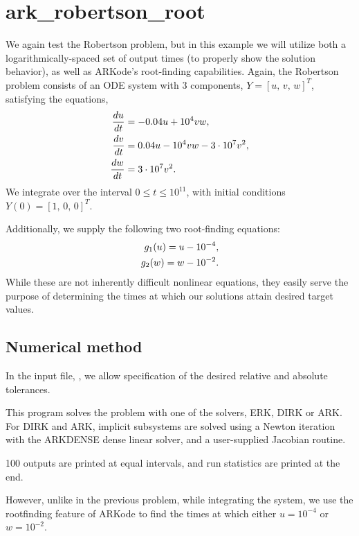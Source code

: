 \documentclass[letterpaper,10pt,english]{sphinxmanual}
\begin{document}
\chapter{ark\_robertson\_root}
\label{ark_robertson_root:ark-robertson-root}\label{ark_robertson_root::doc}\label{ark_robertson_root:id1}
We again test the Robertson problem, but in this example we will
utilize both a logarithmically-spaced set of output times (to properly
show the solution behavior), as well as ARKode's root-finding
capabilities.  Again, the Robertson problem consists of an ODE system
with 3 components, $Y = [u,\, v,\, w]^T$, satisfying the equations,
\begin{gather}
\begin{split}\frac{du}{dt} &= -0.04 u + 10^4 v w, \\
\frac{dv}{dt} &= 0.04 u - 10^4 v w - 3\cdot10^7 v^2, \\
\frac{dw}{dt} &= 3\cdot10^7 v^2.\end{split}\notag
\end{gather}
We integrate over the interval $0\le t\le 10^{11}$, with initial
conditions  $Y(0) = [1,\, 0,\, 0]^T$.

Additionally, we supply the following two root-finding equations:
\begin{gather}
\begin{split}g_1(u) = u - 10^{-4}, \\
g_2(w) = w - 10^{-2}.\end{split}\notag
\end{gather}
While these are not inherently difficult nonlinear equations, they
easily serve the purpose of determining the times at which our
solutions attain desired target values.


\section{Numerical method}
\label{ark_robertson_root:numerical-method}
In the input file, , we allow specification of
the desired relative and absolute tolerances.

This program solves the problem with one of the solvers, ERK, DIRK or
ARK.  For DIRK and ARK, implicit subsystems are solved using a Newton
iteration with the ARKDENSE dense linear solver, and a user-supplied
Jacobian routine.

100 outputs are printed at equal intervals, and run statistics are
printed at the end.

However, unlike in the previous problem, while integrating the system,
we use the rootfinding feature of ARKode to find the times at which
either $u=10^{-4}$ or $w=10^{-2}$.
\end{document}
